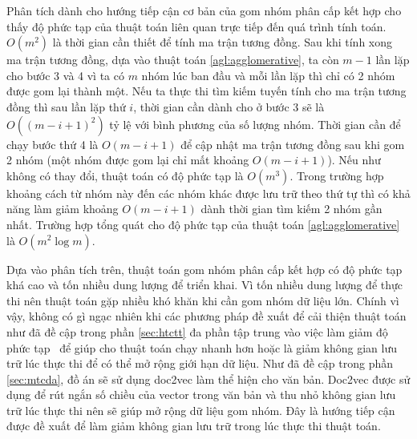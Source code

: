 Phân tích dành cho hướng tiếp cận cơ bản của gom nhóm phân cấp kết hợp cho thấy độ phức tạp của thuật toán liên quan trực tiếp đến quá trình tính toán.
$O(m^2)$ là thời gian cần thiết để tính ma trận tương đồng.
Sau khi tính xong ma trận tương đồng, dựa vào thuật toán \ref{agl:agglomerative}, ta còn $m - 1$ lần lặp cho bước 3 và 4 vì ta có $m$ nhóm lúc ban đầu và mỗi lần lặp thì chỉ có 2 nhóm được gom lại thành một.
Nếu ta thực thi tìm kiếm tuyến tính cho ma trận tương đồng thì sau lần lặp thứ $i$, thời gian cần dành cho ở bước 3 sẽ là $O((m - i + 1)^2)$ tỷ lệ với bình phương của số lượng nhóm.
Thời gian cần để chạy bước thứ 4 là $O(m - i + 1)$ để cập nhật ma trận tương đồng sau khi gom 2 nhóm (một nhóm được gom lại chỉ mất khoảng $O(m - i + 1)$).
Nếu như không có thay đổi, thuật toán có độ phức tạp là $O(m^3)$.
Trong trường hợp khoảng cách từ nhóm này đến các nhóm khác được lưu trữ theo thứ tự thì có khả năng làm giảm khoảng $O(m - i + 1)$ dành thời gian tìm kiếm 2 nhóm gần nhất.
Trường hợp tổng quát cho độ phức tạp của thuật toán \ref{agl:agglomerative} là $O(m^2 \log m)$.

Dựa vào phân tích trên, thuật toán gom nhóm phân cấp kết hợp có độ phức tạp khá cao và tốn nhiều dung lượng để triển khai.
Vì tốn nhiều dung lượng để thực thi nên thuật toán gặp nhiều khó khăn khi cần gom nhóm dữ liệu lớn.
Chính vì vậy, không có gì ngạc nhiên khi các phương pháp đề xuất để cải thiện thuật toán như đã đề cập trong phần \ref{sec:htctt} đa phần tập trung vào việc làm giảm độ phức tạp~\cite{hac-constraints, single-link-hash} để giúp cho thuật toán chạy nhanh hơn hoặc là giảm không gian lưu trữ lúc thực thi để có thể mở rộng giới hạn dữ liệu.
Như đã đề cập trong phần \ref{sec:mtcda}, đồ án sẽ sử dụng doc2vec làm thể hiện cho văn bản.
Doc2vec được sử dụng để rút ngắn số chiều của vector trong văn bản và thu nhỏ không gian lưu trữ lúc thực thi nên sẽ giúp mở rộng dữ liệu gom nhóm.
Đây là hướng tiếp cận được đề xuất để làm giảm không gian lưu trữ trong lúc thực thi thuật toán.

